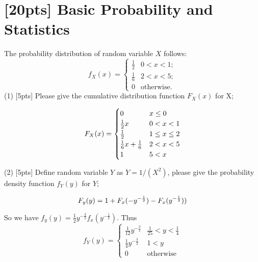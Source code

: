 
	\maketitle
	\section{[20pts] Basic Probability and Statistics}
	The probability distribution of random variable $X$ follows:\\
	\begin{equation}
	f_X(x)=\begin{cases}
	\frac{1}{2} & 0<x<1;\\
	\frac{1}{6} & 2<x<5;\\
	0 & \text{otherwise}.
	\end{cases}
	\end{equation} 
	(1) [5pts] Please give the cumulative distribution function $F_X(x)$ for X;\\ 

	\begin{solution}
		\begin{equation}
			F_X(x)=\begin{cases}
				0 & x \leq 0 \\
				\frac{1}{2}x & 0 < x < 1 \\
				\frac{1}{2} & 1 \leq x \leq 2 \\
				\frac{1}{6}x+\frac{1}{6} & 2 < x < 5 \\
				1 & 5 < x
			\end{cases}\notag
		\end{equation}
	\end{solution}
	
	(2) [5pts] Define random variable $Y$ as $Y=1/(X^2)$, please give the probability density function $f_Y(y)$ for $Y$;\\ 
	
	\begin{solution}
		
		\begin{equation}
			F_y(y)=1+F_x(-y^{-\frac{1}{2}})-F_x(y^{-\frac{1}{2}}))\notag
		\end{equation}

		So we have $f_y(y)=\frac{1}{2}y^{-\frac{3}{2}}f_x(y^{-\frac{1}{2}})$. Thus 
		\begin{equation}
			f_Y(y)=\begin{cases}
				\frac{1}{12}y^{-\frac{3}{2}} & \frac{1}{25} < y < \frac{1}{4} \\
				\frac{1}{4}y^{-\frac{3}{2}} & 1 < y \\
				0 & \text{otherwise}
			\end{cases}
		\end{equation}
	\end{solution}
			

